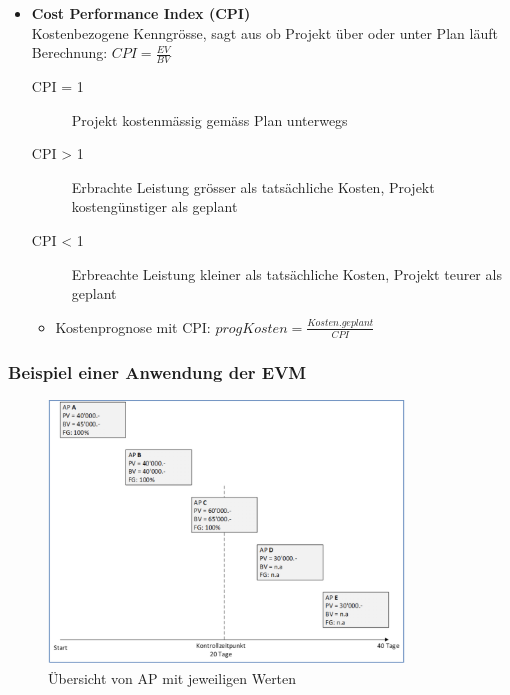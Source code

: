 \documentclass[a4paper]{article}
\begin{document}
\begin{itemize}[itemsep=0.5em]
			\item \textbf{Cost Performance Index (CPI)}\\
			Kostenbezogene Kenngrösse, sagt aus ob Projekt über oder unter Plan läuft\\
			Berechnung: $CPI = \frac{EV}{BV}$
				\begin{description}
					\item[CPI = 1] Projekt kostenmässig gemäss Plan unterwegs
					\item[CPI > 1] Erbrachte Leistung grösser als tatsächliche Kosten, Projekt kostengünstiger als geplant
					\item[CPI < 1] Erbreachte Leistung kleiner als tatsächliche Kosten, Projekt teurer als geplant\\
				\end{description}
			\begin{itemize}
				\item Kostenprognose mit CPI: $progKosten = \frac{Kosten.geplant}{CPI}$\\
			\end{itemize}
			
		\end{itemize}
		
\newpage

		\subsubsection{Beispiel einer Anwendung der EVM}
		
		\begin{figure}[!htb]
			\centering
			\includegraphics[height=7cm]{img/pm/evm_example.png}
			\caption{Übersicht von AP mit jeweiligen Werten}
			\label{fig:pm_evm_example}
		\end{figure}
	
\end{document}
